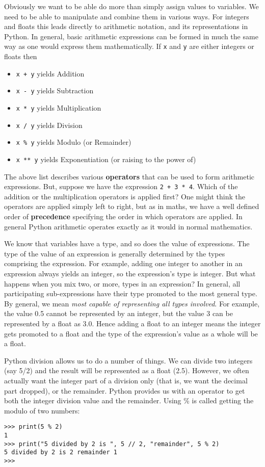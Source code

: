 Obviously we want to be able do more than simply assign values to   variables. We need to be able to manipulate and combine them in various   ways. For integers and floats this leads directly to arithmetic   notation, and its representations in Python. In general, basic arithmetic expressions can be formed in much the same way as one would express them mathematically. If \texttt{x} and \texttt{y} are either   integers or floats then
\begin{itemize}
	\item 
\texttt{x + y} yields Addition
	\item 
\texttt{x - y} yields Subtraction
	\item 
\texttt{x * y} yields Multiplication
	\item 
\texttt{x / y} yields Division
	\item 
\texttt{x \% y} yields Modulo (or Remainder)
	\item 
\texttt{x ** y} yields Exponentiation (or raising to the power of)
\end{itemize}

The above list describes various \textbf{operators} that can   be used to form arithmetic expressions. But, suppose we have the   expression 
\texttt{2 + 3 * 4}. Which of the addition or the   multiplication operators is applied first? One might think the   operators are applied simply left to right, but as in maths, we   have a well defined order of \textbf{precedence} specifying   the order in which operators are applied.    In general Python arithmetic operates exactly as it would in normal   mathematics.

We know that variables have a type, and so does the value of expressions.   The type of the value of an   expression is generally determined by the types comprising the   expression. For example, adding one integer to another in an expression   always yields an integer, so the expression's type is integer. But what   happens when you mix two, or more, types in an expression? In general,   all participating sub-expressions have their type promoted to the most   general type. By general, we mean \textit{most capable of representing all   types involved}. For example, the value 0.5 cannot be represented by an   integer, but the value 3 can be represented by a float as 3.0. Hence   adding a float to an integer means the integer gets promoted to a float   and the type of the expression's value as a whole will be a float.   

Python division allows us to do a number of things. We can divide two integers (say 5/2) and the result will be represented     as a float (2.5). However, we often actually want the integer part of a division only (that is, we want the decimal part dropped),   or the remainder. Python provides us with an operator to   get both the integer division value and the remainder. Using \% is called getting the modulo of two numbers:
\begin{lstlisting}
>>> print(5 % 2)
1
>>> print("5 divided by 2 is ", 5 // 2, "remainder", 5 % 2)
5 divided by 2 is 2 remainder 1
>>>
\end{lstlisting}

